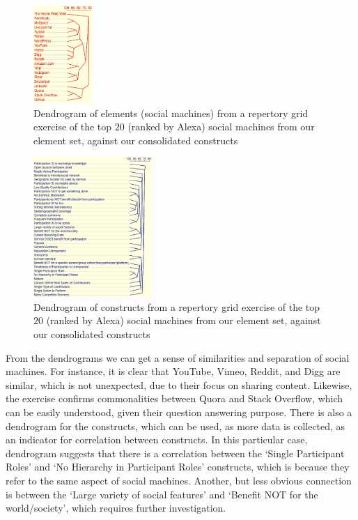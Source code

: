 \documentclass{sig-alternate}
\begin{document}
\begin{figure}[htb]
\begin{center}
\includegraphics[width=0.2\textwidth]{img/dendrogram-elements.png}
\caption{Dendrogram of elements (social machines) from a repertory grid exercise of the top $20$ (ranked by Alexa) social machines from our element set, against our consolidated constructs} \label{dendrogram}
\end{center}
\end{figure}

\begin{figure}[htb]
\begin{center}
\includegraphics[width=0.4\textwidth]{img/dendrogram-constructs.png}
\caption{Dendrogram of constructs from a repertory grid exercise of the top $20$ (ranked by Alexa) social machines from our element set, against our consolidated constructs} \label{dendrogram}
\end{center}
\end{figure}

From the dendrograms we can get a sense of similarities and separation of social machines. For
instance, it is clear that YouTube, Vimeo, Reddit, and Digg are similar, which is not unexpected, due to their focus on sharing content. Likewise, the exercise confirms commonalities between Quora and Stack Overflow, which can be easily understood, given their question answering purpose. There is also a dendrogram for the constructs, which can be used, as more data is collected, as an indicator for correlation between constructs. In this particular case, dendrogram suggests that there is a correlation between the `Single Participant Roles' and `No Hierarchy in Participant Roles' constructs, which is because they refer to the same aspect of social machines. Another, but less obvious connection is between the `Large variety of social features' and `Benefit NOT for the world/society', which requires further investigation.
\end{document}
